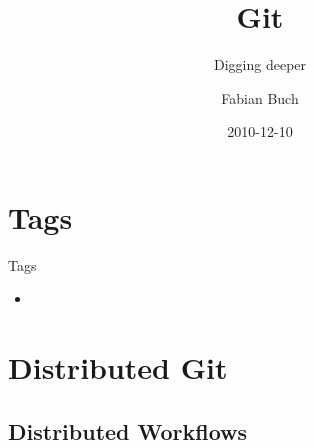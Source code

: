 \documentclass{beamer}
\title[] %
{Git}
\subtitle
{Digging deeper}
\author[] %
{Fabian Buch}
\institute[] %
{Synyx GmbH \& Co. KG}
\date[] %
{2010-12-10}
\begin{document}



\begin{frame}
  \titlepage
\end{frame}







\section{Tags}

\begin{frame}{Tags}
  \begin{itemize}
  \item
    
  \end{itemize}
\end{frame}

\section{Distributed Git}

\subsection{Distributed Workflows}
\end{document}
